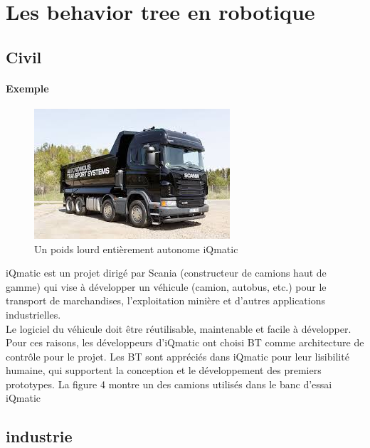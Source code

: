 \documentclass[titlepage]{article}
\begin{document}
	\section{Les behavior tree en robotique}
		\subsection{Civil}
		\paragraph{Exemple}
		\begin{figure}[h!]
			\includegraphics[width=\linewidth]{img/vehicul.jpg}
			\caption{Un poids lourd entièrement autonome iQmatic}
			\label{fig:civil}
		\end{figure}	
		iQmatic est un projet dirigé par Scania (constructeur de camions haut de gamme) qui vise à développer un véhicule (camion, autobus, etc.) pour le transport de marchandises, l’exploitation minière et d’autres applications industrielles. 
		\\
		Le logiciel du véhicule doit être réutilisable, maintenable et facile à développer. Pour ces raisons, les développeurs d’iQmatic ont choisi BT comme architecture de contrôle pour le projet.
		Les BT sont appréciés dans iQmatic pour leur lisibilité humaine, qui supportent la conception et le développement des premiers prototypes. La figure 4 montre un des camions utilisés dans le banc d’essai iQmatic
		\subsection{industrie}
\end{document}
